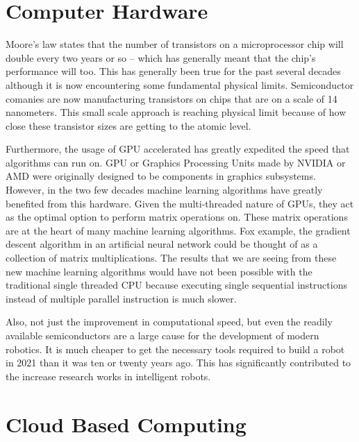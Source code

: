 \documentclass[conference]{IEEEtran}
\begin{document}
\section{Computer Hardware}
Moore’s law states that the number of transistors on a microprocessor chip will double every two years or so -- which has generally meant that the chip's performance will too\autocite{waldrop2016chips}. This has generally been true for the past several decades although  it is now encountering some fundamental physical limits. Semiconductor comanies are now manufacturing transistors on chips that are on a scale of 14 nanometers\autocite{pratt2015cambrian}. This small scale approach is reaching physical limit because of how close these transistor sizes are getting to the atomic level\autocite{waldrop2016chips}.

Furthermore, the usage of GPU accelerated has greatly expedited the speed that algorithms can run on. GPU or Graphics Processing Units made by NVIDIA or AMD were originally designed to be components in graphics subsystems. However, in the two few decades machine learning algorithms have greatly benefited from this hardware. Given the multi-threaded nature of GPUs, they act as the optimal option to perform matrix operations on\autocite{steinkraus2005using}. These matrix operations are at the heart of many machine learning algorithms. Fox example, the gradient descent algorithm in an artificial neural network could be thought of as a collection of matrix multiplications\autocite{krizhevsky2012imagenet}. The results that we are seeing from these new machine learning algorithms would have not been possible with the traditional single threaded CPU because executing single sequential instructions instead of multiple parallel instruction is much slower. 

Also, not just the improvement in computational speed, but even the readily available semiconductors are a large cause for the development of modern robotics. It is much cheaper to get the necessary tools required to build a robot in 2021 than it was ten or twenty years ago. This has significantly contributed to the increase research works in intelligent robots.

\section{Cloud Based Computing}
\end{document}
